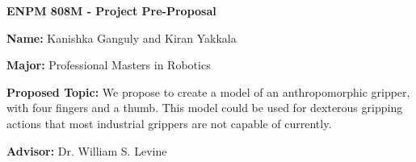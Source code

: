 \documentclass[12pt]{article}
\begin{document}
\thispagestyle{empty}

\bigskip
\bigskip

\centerline{\textbf{\Large{ENPM 808M - Project Pre-Proposal}}}

\bigskip
\bigskip


\noindent \textbf{Name:} %
Kanishka Ganguly and Kiran Yakkala

\bigskip

\noindent \textbf{Major:} %
Professional Masters in Robotics

\bigskip 

\noindent \textbf{Proposed Topic:} %
We propose to create a model of an anthropomorphic gripper, with four fingers and a thumb. This model could be used for dexterous gripping actions that most industrial grippers are not capable of currently.

\bigskip

\noindent \textbf{Advisor:} %
Dr. William S. Levine

\bigskip
\end{document}
